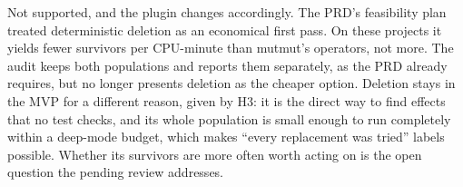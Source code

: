   \item[Deletion is not a cheap substitute for classical mutation (PRD F5, F6a; H2).] Not supported, and the plugin changes accordingly. The PRD's feasibility plan treated deterministic deletion as an economical first pass. On these projects it yields fewer survivors per CPU-minute than mutmut's operators, not more. The audit keeps both populations and reports them separately, as the PRD already requires, but no longer presents deletion as the cheaper option. Deletion stays in the MVP for a different reason, given by H3: it is the direct way to find effects that no test checks, and its whole population is small enough to run completely within a deep-mode budget, which makes ``every replacement was tried'' labels possible. Whether its survivors are more often worth acting on is the open question the pending review addresses.
